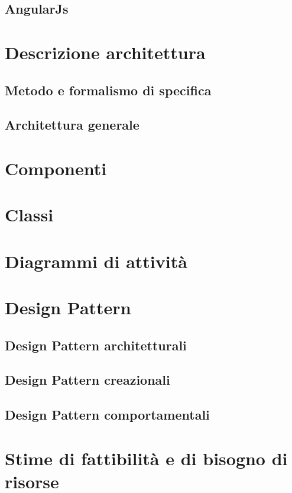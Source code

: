\subsection{AngularJs}

\newpage
\section{Descrizione architettura}
\subsection{Metodo e formalismo di specifica}
\subsection{Architettura generale}

\newpage
\section{Componenti}

\newpage
\section{Classi}

\newpage
\section{Diagrammi di attività}

\newpage
\section{Design Pattern}%
\subsection{Design Pattern architetturali} %
\subsection{Design Pattern creazionali} %
\subsection{Design Pattern comportamentali} %

\newpage
\section{Stime di fattibilità e di bisogno di risorse}%

